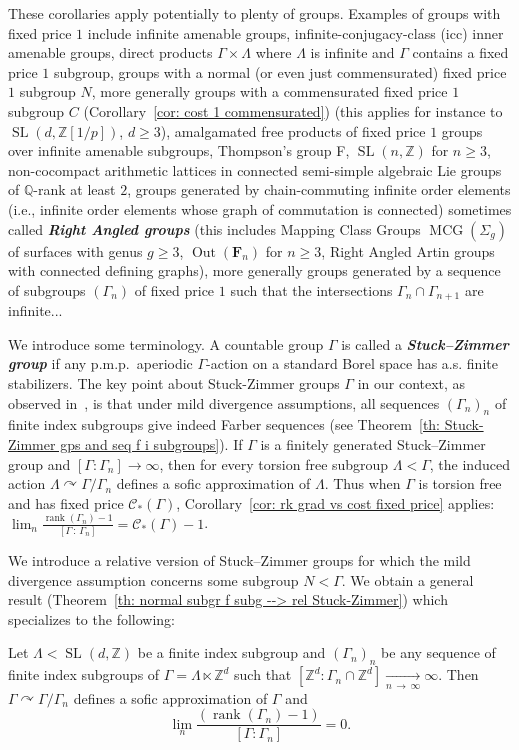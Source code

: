 \documentclass[AHL,Unicode,longabstracts,published]{cedram}
\newcommand{\defin}[1]{\textbf{\emph{#1}}}
\newcommand{\Zmath}{\mathbb{Z}}
\newcommand{\Qmath}{\mathbb{Q}}
\newcommand{\FF}{\mathbf{F}}
\newcommand{\acting}{\curvearrowright}
\newcommand{\vraicost}{\mathscr{C}}
\DeclareMathOperator{\rank}{rank}
\DeclareMathOperator{\SL}{SL}
\DeclareMathOperator{\MCG}{MCG}
\DeclareMathOperator{\Out}{Out}
\newcommand{\pmp}{p.m.p.\ }
\begin{document}
These corollaries apply potentially to plenty of groups. Examples of groups with fixed price $1$ include infinite amenable groups, infinite-conjugacy-class (icc) inner amenable groups, direct products $\Gamma\times \Lambda$ where $\Lambda$ is infinite and $\Gamma$ contains a fixed price $1$ subgroup, groups with a normal (or even just commensurated) fixed price $1$ subgroup $N$, more generally groups with a commensurated fixed price $1$ subgroup $C$ (Corollary~\ref{cor: cost 1 commensurated}) (this applies for instance to $\SL(d, \Zmath[1/p])$, $d\geq 3$), amalgamated free products of fixed price $1$ groups over infinite amenable subgroups, Thompson’s group F, $\SL(n,\Zmath)$ for $n\geq 3$, non-cocompact arithmetic lattices in connected semi-simple algebraic Lie groups of $\Qmath$-rank at least $2$, groups generated by chain-commuting infinite order elements (i.e., infinite order elements whose graph of commutation is connected) sometimes called
\defin{Right Angled groups} (this includes Mapping Class Groups $\MCG(\Sigma_g)$ of surfaces with genus $g\geq 3$, $\Out(\FF_n)$ for $n\geq 3$, Right Angled Artin groups with connected defining graphs), more generally groups generated by a sequence of subgroups $(\Gamma_n)$ of fixed price $1$ such that the intersections $\Gamma_{n}\cap \Gamma_{n+1}$ are infinite...


We introduce some terminology. A countable group $\Gamma$ is called a
\defin{Stuck--Zimmer group} if any \pmp aperiodic $\Gamma$-action on a standard Borel space has a.s. finite stabilizers. The key point about Stuck-Zimmer groups $\Gamma$ in our context, as observed in~\cite{7s-2017}, is that under mild divergence assumptions, all sequences $(\Gamma_n)_n$ of finite index subgroups give indeed Farber sequences (see Theorem~\ref{th: Stuck-Zimmer gps and seq f i subgroups}). If $\Gamma$ is a finitely generated Stuck--Zimmer group and $[\Gamma:\Gamma_n]\to \infty$, then for every torsion free subgroup $\Lambda<\Gamma$, the induced action $\Lambda\acting \Gamma/\Gamma_n$ defines a sofic approximation of $\Lambda$. Thus when $\Gamma$ is torsion free and has fixed price $\vraicost_*(\Gamma)$, Corollary~\ref{cor: rk grad vs cost fixed price} applies: $\lim_{n}\tfrac{ \rank (\Gamma_n)-1}{ [\Gamma\,:\,\Gamma_n]}=\vraicost_*(\Gamma)-1$.



We introduce a relative version of Stuck--Zimmer groups for which the mild divergence assumption concerns some subgroup $N<\Gamma$. We obtain a general result (Theorem~\ref{th: normal subgr f subg --> rel Stuck-Zimmer}) which specializes to the following:
\begin{theo}\label{th: intro SLd rel Stuck-Zimmer}
Let $\Lambda<\SL(d,\Zmath)$ be a finite index subgroup and $(\Gamma_n)_n$ be any sequence of finite index subgroups of $\Gamma=\Lambda\ltimes \Zmath^d$ such that $[\Zmath^d:\Gamma_n\cap \Zmath^d]\underset{n\,\to\,\infty}{\longrightarrow}\infty$. Then $\Gamma\acting \Gamma/\Gamma_n$ defines a sofic approximation of $\Gamma$ and
\begin{equation}
\lim_{n}
\frac{\left(\rank (\Gamma_n)-1\right)}{ [\Gamma:\Gamma_n]}=0.
\end{equation}
\end{theo}
\end{document}

